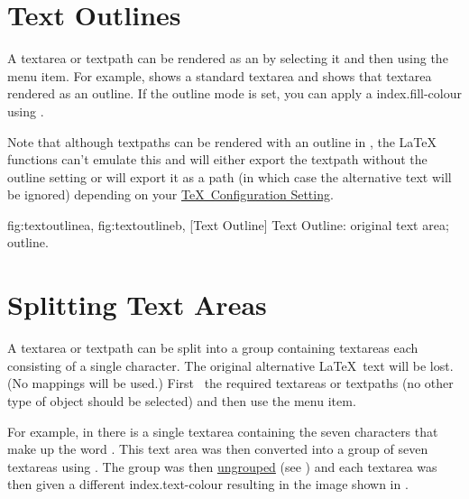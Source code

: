 
\section{Text Outlines}\label{sec:textoutline}


A \gls{textarea} or \gls{textpath} can be rendered as an
 by
selecting it and then using the 
menu item. For example,  shows a
standard \gls*{textarea} and  shows
that \gls*{textarea} rendered as an outline. If the outline mode is
set, you can apply a \gls{index.fill-colour} using
.

\begin{warning}
Note that although \glspl*{textpath} can be rendered with an outline in \FlowframTk,
the \LaTeX\  functions can't emulate
this and will either export the \gls*{textpath} without the outline
setting or will export it as a path (in which case the alternative
text will be ignored) depending on your
\hyperref[sec:texconfig]{\TeX\ Configuration Setting}.
\end{warning}

{
 {fig:textoutlinea}{}{},
 {fig:textoutlineb}{}{},
}
[Text Outline]
{Text Outline:  original text area;
   outline.}



\section{Splitting Text Areas}\label{sec:splittext}


A \gls{textarea} or \gls{textpath} can be split into a \gls{group}
containing \glspl{textarea} each consisting of a single character.
The original alternative \LaTeX\ text will be lost. (No mappings
will be used.) First \select\ the required \glspl{textarea} or
\glspl{textpath} (no other type of \gls{object} should be selected)
and then use the  menu item.

For example, in  there is a single 
\gls{textarea} containing the seven characters that make up the word
.  This text area was then converted into a group of
seven \glspl*{textarea} using . The group was
then \hyperref[sec:grouping]{ungrouped} (see ) 
and each \gls{textarea} was then given a different
\gls{index.text-colour} resulting in the image
shown in .


